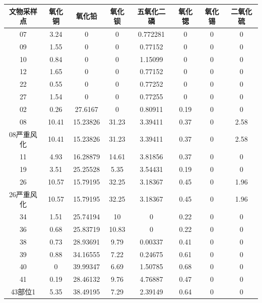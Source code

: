 \documentclass[withoutpreface,bwprint]{cumcmthesis} %
\begin{document}
\begin{appendices}
\newpage

\begin{table}[H]
  \begin{tabular}{cccccccc}
    \toprule[1.5pt]
    文物采样点  & 氧化铜   & 氧化铅      & 氧化钡   & 五氧化二磷    & 氧化锶  & 氧化锡  & 二氧化硫 \\ \hline
    07     & 3.24  & 0        & 0     & 0.772281 & 0    & 0    & 0    \\
    09     & 1.55  & 0        & 0     & 0.77152  & 0    & 0    & 0    \\
    10     & 0.84  & 0        & 0     & 1.15099  & 0    & 0    & 0    \\
    12     & 1.65  & 0        & 0     & 0.77152  & 0    & 0    & 0    \\
    22     & 0.55  & 0        & 0     & 0.77252  & 0    & 0    & 0    \\
    27     & 1.54  & 0        & 0     & 0.77255  & 0    & 0    & 0    \\
    02     & 0.26  & 27.6167  & 0     & 0.80911  & 0.19 & 0    & 0    \\
    08     & 10.41 & 15.23826 & 31.23 & 3.39411  & 0.37 & 0    & 2.58 \\
    08严重风化 & 10.41 & 15.23826 & 31.23 & 3.39411  & 0.37 & 0    & 2.58 \\
    11     & 4.93  & 16.28879 & 14.61 & 3.81856  & 0.37 & 0    & 0    \\
    19     & 3.51  & 25.25528 & 5.35  & 3.54431  & 0.19 & 0    & 0    \\
    26     & 10.57 & 15.79195 & 32.25 & 3.18367  & 0.45 & 0    & 1.96 \\
    26严重风化 & 10.57 & 15.79195 & 32.25 & 3.18367  & 0.45 & 0    & 1.96 \\
    34     & 1.51  & 25.74194 & 10    & 0        & 0.22 & 0    & 0    \\
    36     & 0.68  & 25.83719 & 10.83 & 0        & 0.22 & 0    & 0    \\
    38     & 0.73  & 28.93691 & 9.79  & 0.00337  & 0.41 & 0    & 0    \\
    39     & 0.88  & 34.16555 & 7.22  & 0.24675  & 0.61 & 0    & 0    \\
    40     & 0     & 39.99347 & 6.69  & 1.50785  & 0.68 & 0    & 0    \\
    41     & 0.19  & 28.46132 & 9.76  & 4.76887  & 0.47 & 0    & 0    \\
    43部位1  & 5.35  & 38.49195 & 7.29  & 2.39149  & 0.64 & 0    & 0    \\

\end{tabular}
\end{table}
\end{appendices}
\end{document}
